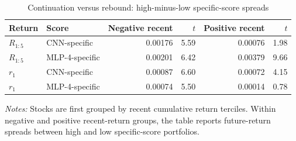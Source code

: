 \begin{table}[htbp]
\centering
\caption{Continuation versus rebound: high-minus-low specific-score spreads}
\label{tab:mechanism_direction}
\begin{tabular}{llrrrr}
\toprule
Return & Score & Negative recent & $t$ & Positive recent & $t$ \\
\midrule
$R_{1:5}$ & CNN-specific & 0.00176 & 5.59 & 0.00076 & 1.98 \\
$R_{1:5}$ & MLP-4-specific & 0.00201 & 6.42 & 0.00379 & 9.66 \\
$r_1$ & CNN-specific & 0.00087 & 6.60 & 0.00072 & 4.15 \\
$r_1$ & MLP-4-specific & 0.00074 & 5.50 & 0.00014 & 0.78 \\
\bottomrule
\end{tabular}
\begin{minipage}{0.92\linewidth}
\footnotesize
\textit{Notes:} Stocks are first grouped by recent cumulative return terciles. Within negative and positive recent-return groups, the table reports future-return spreads between high and low specific-score portfolios.
\end{minipage}
\end{table}
